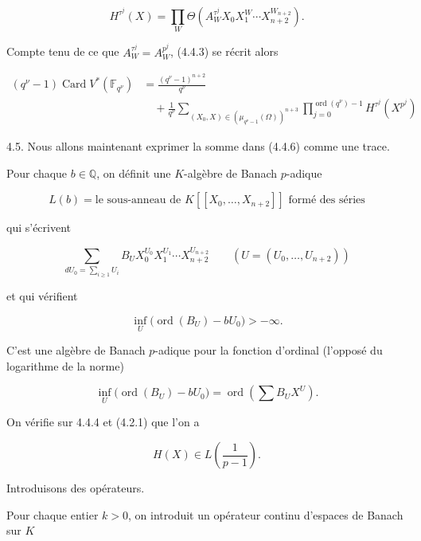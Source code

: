 \[
H^{\tau^j}(X)=\prod_W
\Theta\!\left(A_W^{\tau^j}X_0X_1^{W}\cdots
X_{n+2}^{W_{n+2}}\right).
\]

Compte tenu de ce que $A_W^{\tau^j}=A_W^{p^j}$, (4.4.3) se récrit alors

\begin{equation}\tag{4.4.6}
\begin{aligned}
(q^\nu-1)\operatorname{Card}V^*(\mathbb F_{q^\nu})
&=\frac{(q^\nu-1)^{n+2}}{q^\nu}\\
&\quad+\frac1{q^\nu}
\sum_{(X_0,X)\in(\mu_{q^\nu-1}(\Omega))^{n+3}}
\prod_{j=0}^{\operatorname{ord}(q^\nu)-1}H^{\tau^j}(X^{p^j})
\end{aligned}
\end{equation}

4.5. Nous allons maintenant exprimer la somme dans (4.4.6) comme une trace.

Pour chaque $b\in\mathbb Q$, on définit une $K$-algèbre de Banach $p$-adique

\begin{equation}\tag{4.5.1}
L(b)=\text{le sous-anneau de $K[[X_0,\ldots,X_{n+2}]]$ formé des séries}
\end{equation}

qui s'écrivent

\begin{equation}\tag{4.5.2}
\sum_{dU_0=\sum_{i\geq1}U_i}
B_UX_0^{U_0}X_1^{U_1}\cdots X_{n+2}^{U_{n+2}}
\qquad (U=(U_0,\ldots,U_{n+2}))
\end{equation}

et qui vérifient

\begin{equation}\tag{4.5.3}
\inf_U\bigl(\operatorname{ord}(B_U)-bU_0\bigr)>-\infty.
\end{equation}

C'est une algèbre de Banach $p$-adique pour la fonction d'ordinal
(l'opposé du logarithme de la norme)

\begin{equation}\tag{4.5.4}
\inf_U\bigl(\operatorname{ord}(B_U)-bU_0\bigr)
=\operatorname{ord}\!\left(\sum B_UX^U\right).
\end{equation}

On vérifie sur 4.4.4 et (4.2.1) que l'on a

\[
H(X)\in L\!\left(\frac1{p-1}\right).
\]


Introduisons des opérateurs.

Pour chaque entier $k>0$, on introduit un opérateur continu d'espaces de
Banach sur $K$

